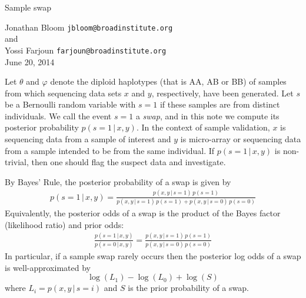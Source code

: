 \documentclass[12pt]{article}
\begin{document}
\begin{center}
{\Large Sample swap}

\medskip
Jonathan Bloom \texttt{jbloom@broadinstitute.org}\\ 
and \\
Yossi Farjoun \texttt{farjoun@broadinstitute.org} \\

June 20, 2014
\end{center}


Let $\theta$ and $\varphi$ denote the diploid haplotypes (that is AA, AB or BB) of samples from which sequencing data sets $x$ and $y$, respectively, have been generated.  
Let $s$ be a Bernoulli random variable with $s=1$ if these samples are from distinct individuals.  
We call the event $s=1$ a {\em swap}, and in this note we compute its posterior probability $p(s = 1 \, | \, x, y)$.  
In the context of sample validation, $x$ is sequencing data from a sample of interest and $y$ is micro-array or sequencing data from a sample intended to be from the same individual.  
If $p(s = 1 \, | \, x, y)$ is non-trivial, then one should flag the suspect data and investigate. 

By Bayes' Rule, the posterior probability of a swap is given by
\begin{align}
\label{prob_swap}
p(s = 1 \, | \, x,y) = \frac{p(x,y \, | \, s = 1) \, p(s=1)}{p(x,y \, | \, s = 1) \, p(s = 1) + p(x,y \, | \, s = 0) \, p(s =0)}
\end{align}
Equivalently, the posterior odds of a swap is the product of the Bayes factor (likelihood ratio) and prior odds:
\begin{align}
\label{odds_swap}
\frac{p(s = 1 \, | \, x,y)}{p(s = 0 \, | \, x,y)} = \frac{p(x,y \, | \, s = 1) \, p(s = 1)}{p(x,y \, | \, s = 0) \, p(s = 0)}
\end{align}
In particular, if a sample swap rarely occurs then the posterior log odds of a swap is well-approximated by
\[
\log(L_1) - \log(L_0) + \log(S)
\]
where $L_i = p(x,y \, | \, s=i)$ and $S$ is the prior probability of a swap.
\end{document}
